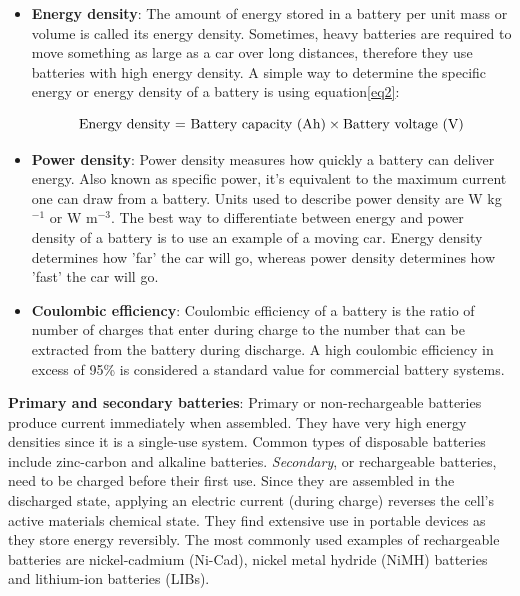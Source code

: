 \begin{itemize}
\item \textbf{Energy density}: The amount of energy stored in a battery per unit mass or volume is called its energy density. Sometimes, heavy batteries are required to move something as large as a car over long distances, therefore they use batteries with high energy density. A simple way to determine the specific energy or energy density of a battery is using equation\ref{eq2}:

\begin{equation} \label{eq2}
    \text{Energy density = } \text{Battery capacity (Ah)} \times \text{Battery voltage (V)}\\
\end{equation}

\item \textbf{Power density}: Power density measures how quickly a battery can deliver energy. Also known as specific power, it's equivalent to the maximum current one can draw from a battery. Units used to describe power density are W kg$^{-1}$ or W m$^{-3}$. The best way to differentiate between energy and power density of a battery is to use an example of a moving car. Energy density determines how 'far' the car will go, whereas power density determines how 'fast' the car will go.

\item \textbf{Coulombic efficiency}: Coulombic efficiency of a battery is the ratio of number of charges that enter during charge to the number that can be extracted from the battery during discharge. A high coulombic efficiency in excess of 95\% is considered a standard value for commercial battery systems. 
\end{itemize}

\textbf{Primary and secondary batteries}: Primary or non-rechargeable batteries produce current immediately when assembled. They have very high energy densities since it is a single-use system. Common types of disposable batteries include zinc-carbon and alkaline batteries. 
\textit{Secondary}, or rechargeable batteries, need to be charged before their first use. Since they are assembled in the discharged state, applying an electric current (during charge) reverses the cell's active materials chemical state. They find extensive use in portable devices as they store energy reversibly. The most commonly used examples of rechargeable batteries are nickel-cadmium (Ni-Cad), nickel metal hydride (NiMH) batteries and lithium-ion batteries (LIBs). 

